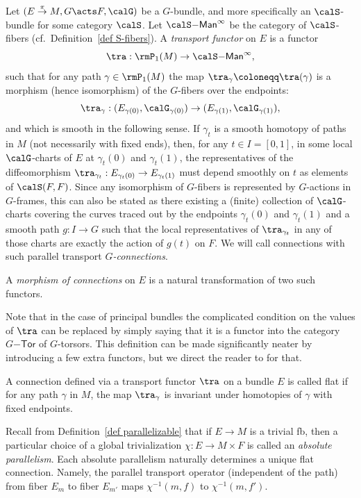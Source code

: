\begin{defn}
    Let $(E\overset{\pi}{\to}M,G\acts F,\calG)$ be a $G$-bundle, and more specifically an $\calS$-bundle for some category $\calS$. Let $\calS\mathsf{-Man}^\infty$ be the category of $\calS$-fibers (cf.~Definition~\ref{def S-fibers}). A \emph{transport functor} on $E$ is a functor
    \[\tra: \rmP_1(M)\to \calS\mathsf{-Man}^\infty,\]
    such that for any path $\gamma\in\rmP_1(M)$ the map $\tra_\gamma\coloneqq \tra(\gamma)$ is a morphism (hence isomorphism) of the $G$-fibers over the endpoints:
    \[\tra_\gamma:(E_{\gamma(0)},\calG_{\gamma(0)})\to (E_{\gamma(1)},\calG_{\gamma(1)}),\]
    and which is smooth in the following sense. If $\gamma_t$ is a smooth homotopy of paths in $M$ (not necessarily with fixed ends), then, for any $t\in I=[0,1]$, in some local $\calG$-charts of $E$ at $\gamma_t(0)$ and $\gamma_t(1)$, the representatives of the diffeomorphism $\tra_{\gamma_t}:E_{\gamma_t(0)}\to E_{\gamma_t(1)}$ must depend smoothly on $t$ as elements of $\calS(F,F)$. Since any isomorphism of $G$-fibers is represented by $G$-actions in $G$-frames, this can also be stated as there existing a (finite) collection of $\calG$-charts covering the curves traced out by the endpoints $\gamma_t(0)$ and $\gamma_t(1)$ and a smooth path $g:I\to G$ such that the local representatives of $\tra_{\gamma_t}$ in any of those charts are exactly the action of $g(t)$ on $F$. We will call connections with such parallel transport \emph{$G$-connections}.

    A \emph{morphism of connections} on $E$ is a natural transformation of two such functors.
\end{defn}

Note that in the case of principal bundles the complicated condition on the values of $\tra$ can be replaced by simply saying that it is a functor into the category $G\mathsf{-Tor}$ of $G$-torsors. This definition can be made significantly neater by introducing a few extra functors, but we direct the reader to \cite{schreiber} for that.

\begin{defn}
    A connection defined via a transport functor $\tra$ on a bundle $E$ is called flat if for any path $\gamma$ in $M$, the map $\tra_\gamma$ is invariant under homotopies of $\gamma$ with fixed endpoints.
\end{defn}


\begin{example}
    Recall from Definition~\ref{def parallelizable} that if $E\to M$ is a trivial \gls{fb}, then a particular choice of a global trivialization $\chi:E\to M\times F$ is called an \emph{absolute parallelism}. Each absolute parallelism naturally determines a unique flat connection. Namely, the parallel transport operator (independent of the path) from fiber $E_m$ to fiber $E_{m'}$ maps $\chi^{-1}(m,f)$ to $\chi^{-1}(m,f')$.
\end{example}

